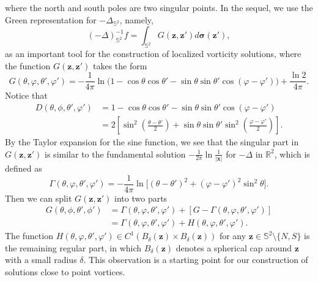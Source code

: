 \documentclass[12pt,reqno]{amsart}
\numberwithin{equation}{section}
\theoremstyle{definition}
\theoremstyle{remark}
\begin{document}
	where the north and south poles are two singular points.
	In the sequel, we use the Green representation for $-\Delta_{\mathbb S^2}$, namely, 
	\begin{equation*}
	   (-\Delta)^{-1}_{\mathbb S^2}f=\int_{\mathbb S^2}G(\boldsymbol z,\boldsymbol z')d\boldsymbol\sigma(\boldsymbol z'),
	\end{equation*}
	as an important tool for the construction of localized vorticity solutions, where the function $G(\boldsymbol z,\boldsymbol z')$ takes the form
	\begin{equation*}
		G(\theta,\varphi,\theta',\varphi')=-\frac{1}{4\pi}\ln\big(1-\cos\theta\cos\theta'-\sin\theta\sin\theta'\cos(\varphi-\varphi')\big)+\frac{\ln2}{4\pi}.
	\end{equation*}
	Notice that  
	\begin{align*}
		D(\theta,\phi,\theta',\varphi')&=1-\cos\theta\cos\theta'-\sin\theta\sin\theta'\cos(\varphi-\varphi')\\
		&=2\left[\sin^2\left(\frac{\theta-\theta'}{2}\right)+\sin\theta\sin\theta'\sin^2\left(\frac{\varphi-\varphi'}{2}\right)\right].
	\end{align*}
    By the Taylor expansion for the sine function, we see that the singular part in $G(\boldsymbol z,\boldsymbol z')$ is similar to the fundamental solution $-\frac{1}{2\pi}\ln\frac{1}{|\boldsymbol x|}$ for $-\Delta$ in $\mathbb R^2$, which is defined as
    \begin{equation*}
    	\Gamma(\theta,\varphi,\theta',\varphi')=-\frac{1}{4\pi}\ln\big[(\theta-\theta')^2+(\varphi-\varphi')^2 \sin^2\theta\big].
    \end{equation*}
    Then we can split $G(\boldsymbol z,\boldsymbol z')$ into two parts
    \begin{equation}\label{1-1}
    	\begin{split}
    	G(\theta,\phi,\theta',\phi')&=\Gamma(\theta,\varphi,\theta',\varphi')+\left[G-\Gamma(\theta,\varphi,\theta',\varphi')\right]\\
    	&=\Gamma(\theta,\varphi,\theta',\varphi')+H(\theta,\varphi,\theta',\varphi').
    	\end{split}
    \end{equation}
    The function $H(\theta,\varphi,\theta',\varphi')\in C^1(B_\delta(\boldsymbol z)\times B_\delta(\boldsymbol z))$ for any $\boldsymbol z\in \mathbb S^2\setminus \{N, S\}$ is the remaining regular part, 
    in which $B_\delta(\boldsymbol z)$ denotes a spherical cap around $\boldsymbol z$ with a small radius $\delta$.
    This observation is a starting point for our construction of solutions close to point vortices. 
	
\end{document}
